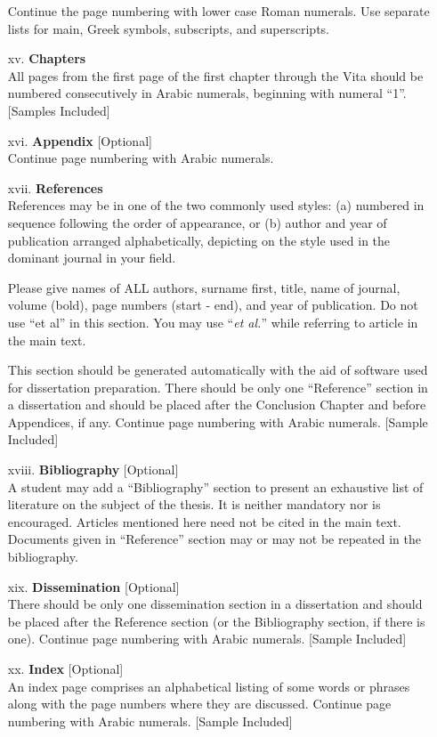 \begin{itemize}
Continue the page numbering with lower case Roman numerals. Use separate lists for main, Greek symbols, subscripts, and superscripts.
\item[xv.] \textbf{Chapters}\\
All pages from the first page of the first chapter through the Vita should be numbered consecutively in Arabic numerals, beginning with numeral ``1''. [Samples Included]
\item[xvi.] \textbf{Appendix} [Optional]\\
Continue page numbering with Arabic numerals.
\item[xvii.] \textbf{References}\\
References may be in one of the two commonly used styles: (a) numbered in sequence following the order of appearance, or (b) author and year of publication arranged alphabetically, depicting on the style used in the dominant journal in your field.
\par Please give names of ALL authors, surname first, title, name of journal, volume (bold), page numbers (start - end), and year of publication. Do not use ``et al'' in this section. You may use ``\textit{et al.}'' while referring to article in the main text.
\par This section should be generated automatically with the aid of software used for dissertation preparation. There should be only one ``Reference'' section in a dissertation and should be placed after the Conclusion Chapter and before Appendices, if any. Continue page numbering with Arabic numerals. [Sample Included]
\item[xviii.] \textbf{Bibliography} [Optional]\\
A student may add a ``Bibliography'' section to present an exhaustive list of literature on the subject of the thesis. It is neither mandatory nor is encouraged. Articles mentioned here need not be cited in the main text. Documents given in ``Reference'' section may or may not be repeated in the bibliography.
\item[xix.] \textbf{Dissemination} [Optional]\\
There should be only one dissemination section in a dissertation and should be placed after the Reference section (or the Bibliography section, if there is one). Continue page numbering with Arabic numerals. [Sample Included]
\item[xx.] \textbf{Index} [Optional]\\
An index page comprises an alphabetical listing of some words or phrases along with the page numbers where they are discussed. Continue page numbering with Arabic numerals. [Sample Included]
\end{itemize}

